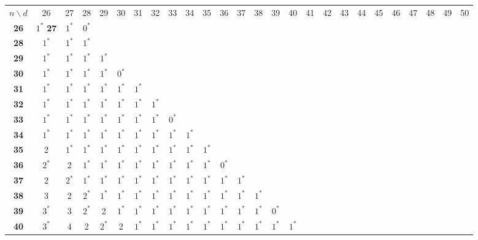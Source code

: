 
\begin{table}
\smaller[2]
\centering
\setlength{\tabcolsep}{4.5pt}
\begin{tabular}{|c| c c c c c c c c c c c c c c c c c c c c c c c c c |}
\hline
$n \backslash  d$ & 26 & 27 & 28 & 29 & 30 & 31 & 32 & 33 & 34 & 35 & 36 & 37 & 38 & 39 & 40 & 41 & 42 & 43 & 44 & 45 & 46 & 47 & 48 & 49 & 50 \\
\Xhline{4\arrayrulewidth}
\textbf{26} & $1^*$
\textbf{27} & $1^*$ & $0^*$ & & & & & & & & & & & & & & & & & & & & & & & \\
\textbf{28} & $1^*$ & $1^*$ & $1^*$ & & & & & & & & & & & & & & & & & & & & & & \\
\textbf{29} & $1^*$ & $1^*$ & $1^*$ & $1^*$ & & & & & & & & & & & & & & & & & & & & & \\
\textbf{30} & $1^*$ & $1^*$ & $1^*$ & $1^*$ & $0^*$ & & & & & & & & & & & & & & & & & & & & \\
\textbf{31} & $1^*$ & $1^*$ & $1^*$ & $1^*$ & $1^*$ & $1^*$ & & & & & & & & & & & & & & & & & & & \\
\textbf{32} & $1^*$ & $1^*$ & $1^*$ & $1^*$ & $1^*$ & $1^*$ & $1^*$ & & & & & & & & & & & & & & & & & & \\
\textbf{33} & $1^*$ & $1^*$ & $1^*$ & $1^*$ & $1^*$ & $1^*$ & $1^*$ & $0^*$ & & & & & & & & & & & & & & & & & \\
\textbf{34} & $1^*$ & $1^*$ & $1^*$ & $1^*$ & $1^*$ & $1^*$ & $1^*$ & $1^*$ & $1^*$ & & & & & & & & & & & & & & & & \\
\textbf{35} & 2 & $1^*$ & $1^*$ & $1^*$ & $1^*$ & $1^*$ & $1^*$ & $1^*$ & $1^*$ & $1^*$ & & & & & & & & & & & & & & & \\
\textbf{36} & $2^*$ & 2 & $1^*$ & $1^*$ & $1^*$ & $1^*$ & $1^*$ & $1^*$ & $1^*$ & $1^*$ & $0^*$ & & & & & & & & & & & & & & \\
\textbf{37} & 2 & $2^*$ & $1^*$ & $1^*$ & $1^*$ & $1^*$ & $1^*$ & $1^*$ & $1^*$ & $1^*$ & $1^*$ & $1^*$ & & & & & & & & & & & & & \\
\textbf{38} & 3 & 2 & $2^*$ & $1^*$ & $1^*$ & $1^*$ & $1^*$ & $1^*$ & $1^*$ & $1^*$ & $1^*$ & $1^*$ & $1^*$ & & & & & & & & & & & & \\
\textbf{39} & $3^*$ & 3 & $2^*$ & 2 & $1^*$ & $1^*$ & $1^*$ & $1^*$ & $1^*$ & $1^*$ & $1^*$ & $1^*$ & $1^*$ & $0^*$ & & & & & & & & & & & \\
\textbf{40} & $3^*$ & 4 & 2 & $2^*$ & 2 & $1^*$ & $1^*$ & $1^*$ & $1^*$ & $1^*$ & $1^*$ & $1^*$ & $1^*$ & $1^*$ & $1^*$ & & & & & & & & & & \\

\end{tabular}
\end{table}
